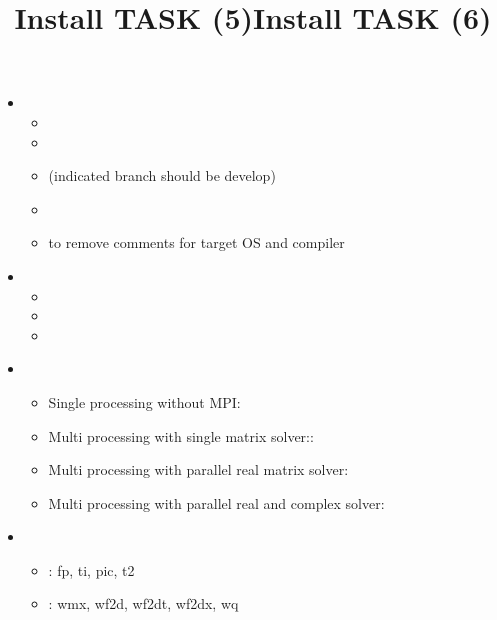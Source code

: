 \documentclass[12pt]{article}
\begin{document}
\title{Install TASK (5)}
\begin{itemize}
\item
{}
\begin{itemize}
\item
{}
\item
{}
\item
{} \quad (indicated branch should be develop)
\item
{}
\item
{} to remove comments for target OS and compiler
\end{itemize}
\item
{}
\begin{itemize}
\item
{}
\item
{}
\item
{}
\end{itemize}
\end{itemize}

\title{Install TASK (6)}
\begin{itemize}
\item
{}
\begin{itemize}
\item
  Single processing without MPI: 
\item
  Multi processing with single matrix solver:: 
\item
  Multi processing with parallel real matrix solver: 
\item
  Multi processing with parallel real and complex solver: \\
\end{itemize}
\item
  \begin{itemize}
  \item
    : fp, ti, pic, t2
  \item
    : wmx, wf2d, wf2dt, wf2dx, wq
  \end{itemize}
\end{itemize}
\end{document}
